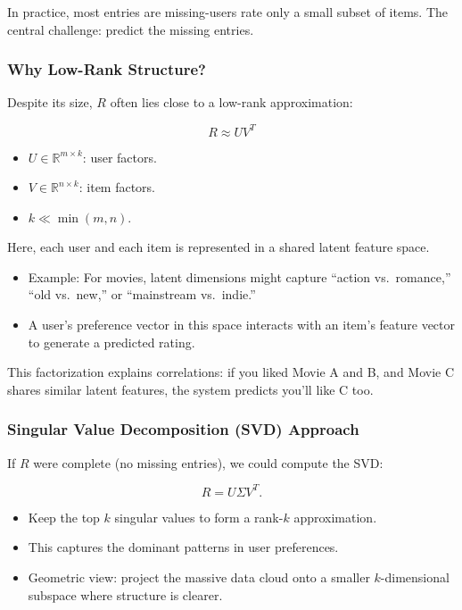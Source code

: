 \documentclass[
  letterpaper,
  DIV=11,
  numbers=noendperiod]{scrreprt}
\providecommand{\tightlist}{%
  \setlength{\itemsep}{0pt}\setlength{\parskip}{0pt}}
\begin{document}
In practice, most entries are missing-users rate only a small subset of
items. The central challenge: predict the missing entries.

\subsubsection{Why Low-Rank Structure?}\label{why-low-rank-structure}

Despite its size, \(R\) often lies close to a low-rank approximation:

\[
R \approx U V^T
\]

\begin{itemize}
\tightlist
\item
  \(U \in \mathbb{R}^{m \times k}\): user factors.
\item
  \(V \in \mathbb{R}^{n \times k}\): item factors.
\item
  \(k \ll \min(m, n)\).
\end{itemize}

Here, each user and each item is represented in a shared latent feature
space.

\begin{itemize}
\tightlist
\item
  Example: For movies, latent dimensions might capture ``action
  vs.~romance,'' ``old vs.~new,'' or ``mainstream vs.~indie.''
\item
  A user's preference vector in this space interacts with an item's
  feature vector to generate a predicted rating.
\end{itemize}

This factorization explains correlations: if you liked Movie A and B,
and Movie C shares similar latent features, the system predicts you'll
like C too.

\subsubsection{Singular Value Decomposition (SVD)
Approach}\label{singular-value-decomposition-svd-approach}

If \(R\) were complete (no missing entries), we could compute the SVD:

\[
R = U \Sigma V^T.
\]

\begin{itemize}
\tightlist
\item
  Keep the top \(k\) singular values to form a rank-\(k\) approximation.
\item
  This captures the dominant patterns in user preferences.
\item
  Geometric view: project the massive data cloud onto a smaller
  \(k\)-dimensional subspace where structure is clearer.
\end{itemize}
\end{document}
